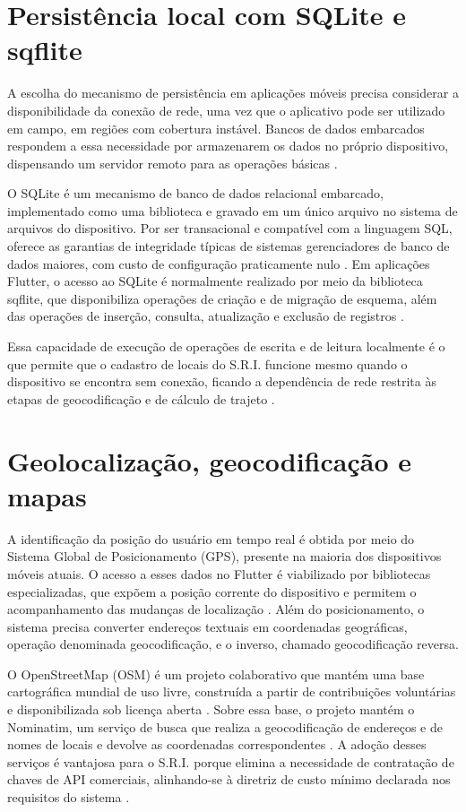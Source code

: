 \section{Persistência local com SQLite e sqflite}

A escolha do mecanismo de persistência em aplicações móveis precisa considerar a disponibilidade da conexão de rede, uma vez que o aplicativo pode ser utilizado em campo, em regiões com cobertura instável. Bancos de dados embarcados respondem a essa necessidade por armazenarem os dados no próprio dispositivo, dispensando um servidor remoto para as operações básicas \cite{sqlite2024}.

O SQLite é um mecanismo de banco de dados relacional embarcado, implementado como uma biblioteca e gravado em um único arquivo no sistema de arquivos do dispositivo. Por ser transacional e compatível com a linguagem SQL, oferece as garantias de integridade típicas de sistemas gerenciadores de banco de dados maiores, com custo de configuração praticamente nulo \cite{sqlite2024}. Em aplicações Flutter, o acesso ao SQLite é normalmente realizado por meio da biblioteca sqflite, que disponibiliza operações de criação e de migração de esquema, além das operações de inserção, consulta, atualização e exclusão de registros \cite{sqflite2024}.

Essa capacidade de execução de operações de escrita e de leitura localmente é o que permite que o cadastro de locais do S.R.I. funcione mesmo quando o dispositivo se encontra sem conexão, ficando a dependência de rede restrita às etapas de geocodificação e de cálculo de trajeto \cite{sriEspecComp2025}.

\section{Geolocalização, geocodificação e mapas}

A identificação da posição do usuário em tempo real é obtida por meio do Sistema Global de Posicionamento (GPS), presente na maioria dos dispositivos móveis atuais. O acesso a esses dados no Flutter é viabilizado por bibliotecas especializadas, que expõem a posição corrente do dispositivo e permitem o acompanhamento das mudanças de localização \cite{geolocator2024}. Além do posicionamento, o sistema precisa converter endereços textuais em coordenadas geográficas, operação denominada geocodificação, e o inverso, chamado geocodificação reversa.

O OpenStreetMap (OSM) é um projeto colaborativo que mantém uma base cartográfica mundial de uso livre, construída a partir de contribuições voluntárias e disponibilizada sob licença aberta \cite{osm2024}. Sobre essa base, o projeto mantém o Nominatim, um serviço de busca que realiza a geocodificação de endereços e de nomes de locais e devolve as coordenadas correspondentes \cite{nominatim2024}. A adoção desses serviços é vantajosa para o S.R.I. porque elimina a necessidade de contratação de chaves de API comerciais, alinhando-se à diretriz de custo mínimo declarada nos requisitos do sistema \cite{sriEspecComp2025}.


